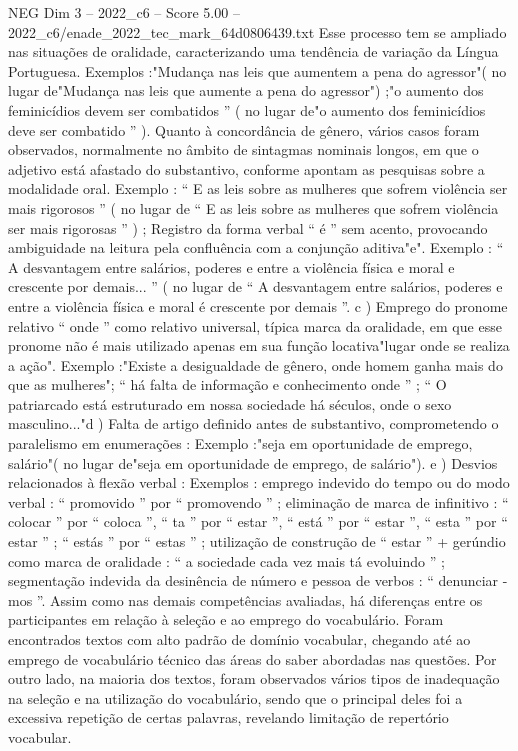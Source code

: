 \begin{textsample}{NEG Dim 3 – 2022\_c6 – Score 5.00 – 2022\_c6/enade\_2022\_tec\_mark\_64d0806439.txt}
Esse processo tem se ampliado nas situações de oralidade, caracterizando uma tendência de variação da Língua Portuguesa.
Exemplos :"Mudança nas leis que aumentem a pena do agressor"( no lugar de"Mudança nas leis que aumente a pena do agressor") ;"o aumento dos feminicídios devem ser combatidos ” ( no lugar de"o aumento dos feminicídios deve ser combatido ” ).
Quanto à concordância de gênero, vários casos foram observados, normalmente no âmbito de sintagmas nominais longos, em que o adjetivo está afastado do substantivo, conforme apontam as pesquisas sobre a modalidade oral.
Exemplo : “ E as leis sobre as mulheres que sofrem violência ser mais rigorosos ” ( no lugar de “ E as leis sobre as mulheres que sofrem violência ser mais rigorosas ” ) ; Registro da forma verbal “ é ” sem acento, provocando ambiguidade na leitura pela confluência com a conjunção aditiva"e".
Exemplo : “ A desvantagem entre salários, poderes e entre a violência física e moral e crescente por demais... ” ( no lugar de “ A desvantagem entre salários, poderes e entre a violência física e moral é crescente por demais ”. c ) Emprego do pronome relativo “ onde ” como relativo universal, típica marca da oralidade, em que esse pronome não é mais utilizado apenas em sua função locativa"lugar onde se realiza a ação".
Exemplo :"Existe a desigualdade de gênero, onde homem ganha mais do que as mulheres"; “ há falta de informação e conhecimento onde ” ; “ O patriarcado está estruturado em nossa sociedade há séculos, onde o sexo masculino..."d ) Falta de artigo definido antes de substantivo, comprometendo o paralelismo em enumerações : Exemplo :"seja em oportunidade de emprego, salário"( no lugar de"seja em oportunidade de emprego, de salário"). e ) Desvios relacionados à flexão verbal : Exemplos : emprego indevido do tempo ou do modo verbal : “ promovido ” por “ promovendo ” ; eliminação de marca de infinitivo : “ colocar ” por “ coloca ”, “ ta ” por “ estar ”, “ está ” por “ estar ”, “ esta ” por “ estar ” ; “ estás ” por “ estas ” ; utilização de construção de “ estar ” + gerúndio como marca de oralidade : “ a sociedade cada vez mais tá evoluindo ” ; segmentação indevida da desinência de número e pessoa de verbos : “ denunciar -mos ”.
Assim como nas demais competências avaliadas, há diferenças entre os participantes em relação à seleção e ao emprego do vocabulário.
Foram encontrados textos com alto padrão de domínio vocabular, chegando até ao emprego de vocabulário técnico das áreas do saber abordadas nas questões.
Por outro lado, na maioria dos textos, foram observados vários tipos de inadequação na seleção e na utilização do vocabulário, sendo que o principal deles foi a excessiva repetição de certas palavras, revelando limitação de repertório vocabular.

\end{textsample}
